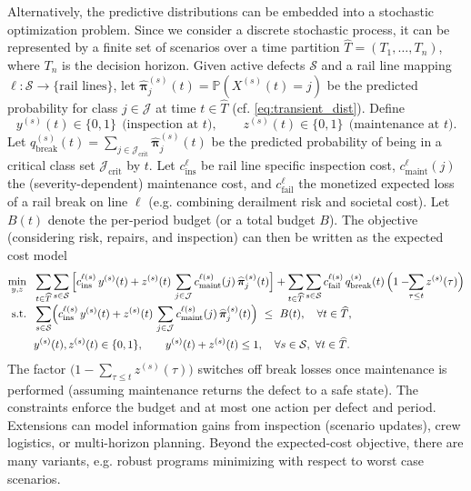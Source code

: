 Alternatively, the predictive distributions can be embedded into a stochastic optimization problem. 
Since we consider a discrete stochastic process, it can be represented by a finite set of scenarios over a time partition $\widehat{T}=(T_1,\dots,T_n)$, where $T_n$ is the decision horizon.
Given active defects $\mathcal{S}$ and a rail line mapping $\ell:\mathcal{S}\to\{\text{rail lines}\}$, let $\widehat{\bm\pi}^{(s)}_j(t)=\mathds{P}(X^{(s)}(t)=j)$ be the predicted probability for class $j\in\mathcal{J}$ at time $t\in\widehat{T}$ (cf. \cref{eq:transient_dist}). Define
\[
y^{(s)}(t)\in\{0,1\}\ \ \text{(inspection at $t$)},\qquad
z^{(s)}(t)\in\{0,1\}\ \ \text{(maintenance at $t$)}.
\]
Let $q^{(s)}_{\mathrm{break}}(t)=\sum_{j\in\mathcal{J}_{\mathrm{crit}}}\widehat{\bm\pi}^{(s)}_j(t)$ be the predicted probability of being in a critical class set $\mathcal{J}_{\mathrm{crit}}$ by $t$.
Let $c_{\mathrm{ins}}^{\ell}$ be rail line specific inspection cost, $c_{\mathrm{maint}}^{\ell}(j)$ the (severity-dependent) maintenance cost, and $c_{\mathrm{fail}}^{\ell}$ the monetized expected loss of a rail break on line $\ell$ (e.g. combining derailment risk and societal cost).
Let $B(t)$ denote the per-period budget (or a total budget $B$).
The objective (considering risk, repairs, and inspection) can then be written as the expected cost model
\begin{align}
\min_{y,z}\ \ 
&\sum_{t\in\widehat{T}}\sum_{s\in\mathcal{S}}
\Big[
c_{\mathrm{ins}}^{\ell(s)}\,y^{(s)}(t)
+ z^{(s)}(t)\,\sum_{j\in\mathcal{J}} c_{\mathrm{maint}}^{\ell(s)}(j)\,\widehat{\bm\pi}^{(s)}_{j}(t)
\Big]
+ \sum_{t\in\widehat{T}}\sum_{s\in\mathcal{S}} 
c_{\mathrm{fail}}^{\ell(s)}\, q^{(s)}_{\mathrm{break}}(t)\,\Bigl(1-\!\!\sum_{\tau\le t} z^{(s)}(\tau)\Bigr)
\label{eq:obj-expected}\\[-0.25em]
\text{s.t.}\ \ 
&\sum_{s\in\mathcal{S}}\!\Big(c_{\mathrm{ins}}^{\ell(s)}\,y^{(s)}(t) 
+ z^{(s)}(t)\,\sum_{j\in\mathcal{J}} c_{\mathrm{maint}}^{\ell(s)}(j)\,\widehat{\bm\pi}^{(s)}_{j}(t)\Big)\ \le\ B(t), \quad \forall t\in\widehat{T}, \label{eq:budget}\\
&y^{(s)}(t),z^{(s)}(t)\in\{0,1\}, \qquad
y^{(s)}(t)+z^{(s)}(t)\le 1, \quad \forall s\in\mathcal{S},\ \forall t\in\widehat{T}. \label{eq:binary}
\end{align}
The factor $\bigl(1-\sum_{\tau\le t} z^{(s)}(\tau)\bigr)$ switches off break losses once maintenance is performed (assuming maintenance returns the defect to a safe state). The constraints enforce the budget and at most one action per defect and period.
Extensions can model information gains from inspection (scenario updates), crew logistics, or multi-horizon planning.
Beyond the expected-cost objective, there are many variants, e.g. robust programs minimizing with respect to worst case scenarios.

